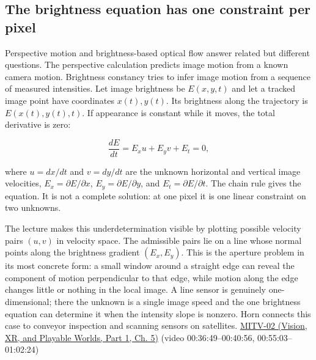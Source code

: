 \subsection{The brightness equation has one constraint per pixel}\label{04-visual-computing-ii-ch030-the-brightness-equation-has-one-constraint-per-pixel}

\hypertarget{04-visual-computing-ii-ch030-the-brightness-equation-has-one-constraint-per-pixel}{}

Perspective motion and brightness-based optical flow answer related but different questions. The perspective calculation predicts image motion from a known camera motion. Brightness constancy tries to infer image motion from a sequence of measured intensities. Let image brightness be \(E(x,y,t)\) and let a tracked image point have coordinates \(x(t),y(t)\). Its brightness along the trajectory is \(E(x(t),y(t),t)\). If appearance is constant while it moves, the total derivative is zero:

\[
\frac{dE}{dt}=E_x u+E_y v+E_t=0,
\]

where \(u=dx/dt\) and \(v=dy/dt\) are the unknown horizontal and vertical image velocities, \(E_x=\partial E/\partial x\), \(E_y=\partial E/\partial y\), and \(E_t=\partial E/\partial t\). The chain rule gives the equation. It is not a complete solution: at one pixel it is one linear constraint on two unknowns.

The lecture makes this underdetermination visible by plotting possible velocity pairs \((u,v)\) in velocity space. The admissible pairs lie on a line whose normal points along the brightness gradient \((E_x,E_y)\). This is the aperture problem in its most concrete form: a small window around a straight edge can reveal the component of motion perpendicular to that edge, while motion along the edge changes little or nothing in the local image. A line sensor is genuinely one-dimensional; there the unknown is a single image speed and the one brightness equation can determine it when the intensity slope is nonzero. Horn connects this case to conveyor inspection and scanning sensors on satellites. \href{../07-Vision-XR-and-Playable-Worlds-P01/main.pdf\#nameddest=04-visual-computing-ii-ch036-mitv-02---image-formation-perspective-projection-time-derivative-motion-field}{MITV-02 (Vision, XR, and Playable Worlds, Part 1, Ch. 5)} (video 00:36:49--00:40:56, 00:55:03--01:02:24)

